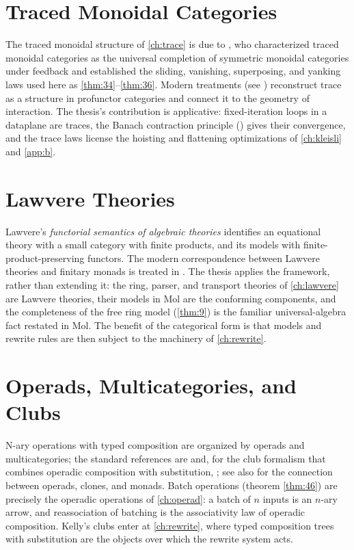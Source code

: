 \section{Traced Monoidal Categories}
The traced monoidal structure of \autoref{ch:trace} is due to \cite{joyalsv}, who characterized traced monoidal categories as the universal completion of symmetric monoidal categories under feedback and established the sliding, vanishing, superposing, and yanking laws used here as \ref{thm:34}--\ref{thm:36}. Modern treatments (see \cite{arxiv-traced-monoidal}) reconstruct trace as a structure in profunctor categories and connect it to the geometry of interaction. The thesis's contribution is applicative: fixed-iteration loops in a dataplane are traces, the Banach contraction principle (\cite{banach}) gives their convergence, and the trace laws license the hoisting and flattening optimizations of \autoref{ch:kleisli} and \autoref{app:b}.

\section{Lawvere Theories}
Lawvere's \emph{functorial semantics of algebraic theories} \cite{lawvere} identifies an equational theory with a small category with finite products, and its models with finite-product-preserving functors. The modern correspondence between Lawvere theories and finitary monads is treated in \cite{arxiv-lawvere}. The thesis applies the framework, rather than extending it: the ring, parser, and transport theories of \autoref{ch:lawvere} are Lawvere theories, their models in Mol are the conforming components, and the completeness of the free ring model (\ref{thm:9}) is the familiar universal-algebra fact restated in Mol. The benefit of the categorical form is that models and rewrite rules are then subject to the machinery of \autoref{ch:rewrite}.

\section{Operads, Multicategories, and Clubs}
N-ary operations with typed composition are organized by operads and multicategories; the standard references are \cite{leinster} and, for the club formalism that combines operadic composition with substitution, \cite{kelly}; see also \cite{arxiv-operads} for the connection between operads, clones, and monads. Batch operations (theorem \ref{thm:46}) are precisely the operadic operations of \autoref{ch:operad}: a batch of $n$ inputs is an $n$-ary arrow, and reassociation of batching is the associativity law of operadic composition. Kelly's clubs enter at \autoref{ch:rewrite}, where typed composition trees with substitution are the objects over which the rewrite system acts.

